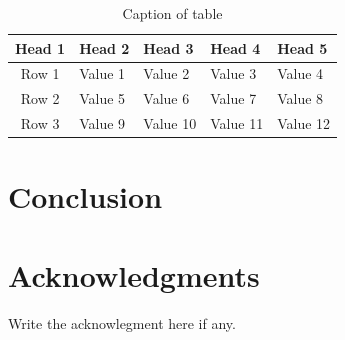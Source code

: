 \documentclass{article}
\begin{document}
\begin{table}
	\centering
	\caption{Caption of table}\label{tab1}
	\begin{tabular}{cllll}
		\hline
		\textbf{Head 1} & \textbf{Head 2} & \textbf{Head 3} & \textbf{Head 4} & \textbf{Head 5}\\
		\hline
		Row 1 & Value 1 & Value 2 & Value 3 & Value 4\\
		Row 2 & Value 5 & Value 6 & Value 7 & Value 8\\
	    Row 3 & Value 9 & Value 10 & Value 11 & Value 12\\
		\hline
	\end{tabular}
\end{table}










\section{Conclusion}


\section*{Acknowledgments}
Write the acknowlegment here if any.


%
%
\end{document}
